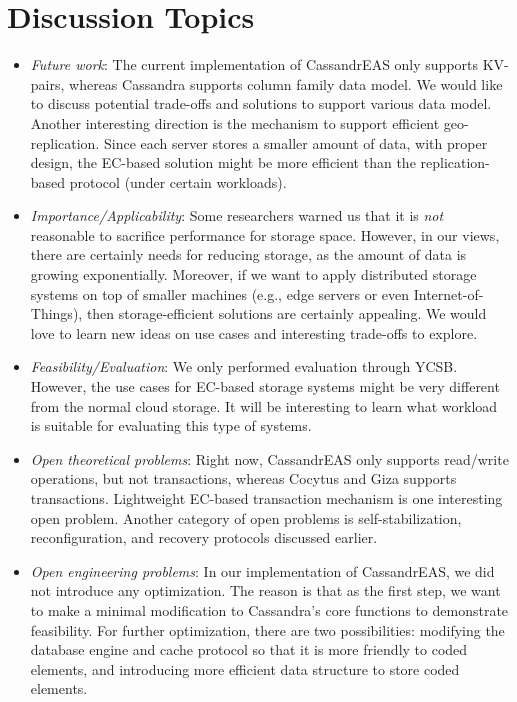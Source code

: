 \section{Discussion Topics}


\begin{itemize}
    \item \textit{Future work}: The current implementation of CassandrEAS only supports KV-pairs, whereas Cassandra supports column family data model. We would like to discuss potential trade-offs and solutions to support various data model. Another interesting direction is the mechanism to support efficient geo-replication. Since each server stores a smaller amount of data, with proper design, the EC-based solution might be more efficient than the replication-based protocol (under certain workloads).

    \item \textit{Importance/Applicability}: Some researchers warned us that it is \textit{not} reasonable to sacrifice performance for storage space. However, in our views, there are certainly needs for reducing storage, as the amount of data is growing exponentially. Moreover, if we want to apply distributed storage systems on top of smaller machines (e.g., edge servers or even Internet-of-Things), then storage-efficient solutions are certainly appealing. We would love to learn new ideas on use cases and interesting trade-offs to explore.
    
    \item \textit{Feasibility/Evaluation}: We only performed evaluation through YCSB. However, the use cases for EC-based storage systems might be very different from the normal cloud storage. It will be interesting to learn what workload is suitable for evaluating this type of systems.
    
    \item \textit{Open theoretical problems}: Right now, CassandrEAS only supports read/write operations, but not transactions, whereas Cocytus \cite{Cocytus2016} and Giza \cite{GIZA2017} supports transactions. Lightweight EC-based transaction mechanism is one interesting open problem. Another category of open problems is self-stabilization, reconfiguration, and recovery protocols discussed earlier.
    
    \item \textit{Open engineering problems}: In our implementation of CassandrEAS, we did not introduce any optimization. The reason is that as the first step, we want to make a minimal modification to Cassandra's core functions to demonstrate feasibility. For further optimization, there are two possibilities: modifying the database engine and cache protocol so that it is more friendly to coded elements, and introducing more efficient data structure to store coded elements.
    

\end{itemize}
